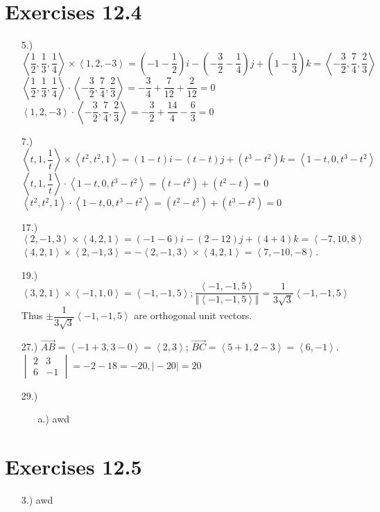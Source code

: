 \documentclass[12pt]{article}
\newcommand{\angleb}[1]{\left\langle#1\right\rangle}
\begin{document}
\pagestyle{fancy}
\fancyhead{}

\normalsize
\section*{Exercises 12.4}
\begin{itemize}
    \item [5.)] $\angleb{\dfrac{1}{2},\dfrac{1}{3},\dfrac{1}{4}}\times\angleb{1,2,-3}=\left(-1-\dfrac{1}{2}\right)i-\left(-\dfrac{3}{2}-\dfrac{1}{4}\right)j+\left(1-\dfrac{1}{3}\right)k=\angleb{-\dfrac{3}{2},\dfrac{7}{4},\dfrac{2}{3}}$\newline
    $\angleb{\dfrac{1}{2},\dfrac{1}{3},\dfrac{1}{4}}\cdot\angleb{-\dfrac{3}{2},\dfrac{7}{4},\dfrac{2}{3}}=-\dfrac{3}{4}+\dfrac{7}{12}+\dfrac{2}{12}=0$\newline
    $\angleb{1,2,-3}\cdot\angleb{-\dfrac{3}{2},\dfrac{7}{4},\dfrac{2}{3}}=-\dfrac{3}{2}+\dfrac{14}{4}-\dfrac{6}{3}=0$

    \item [7.)] $\angleb{t,1,\dfrac{1}{t}}\times\angleb{t^2,t^2,1}=\left(1-t\right)i-(t-t)j+(t^3-t^2)k=\angleb{1-t,0,t^3-t^2}$\newline
    $\angleb{t,1,\dfrac{1}{t}}\cdot\angleb{1-t,0,t^3-t^2}=(t-t^2)+(t^2-t)=0$\newline
    $\angleb{t^2,t^2,1}\cdot\angleb{1-t,0,t^3-t^2}=(t^2-t^3)+(t^3-t^2)=0$

    \item [17.)] $\angleb{2,-1,3}\times\angleb{4,2,1}=(-1-6)i-(2-12)j+(4+4)k=\angleb{-7,10,8}$\newline
    $\angleb{4,2,1}\times\angleb{2,-1,3}=-\angleb{2,-1,3}\times\angleb{4,2,1}=\angleb{7,-10,-8}$.

    \item [19.)] $\angleb{3,2,1}\times\angleb{-1,1,0}=\angleb{-1,-1,5};\dfrac{\angleb{-1,-1,5}}{\Vert\angleb{-1,-1,5}\Vert}=\dfrac{1}{3\sqrt{3}}\angleb{-1,-1,5}$\newline
    Thus $\pm\dfrac{1}{3\sqrt{3}}\angleb{-1,-1,5}$ are orthogonal unit vectors.

    \item [27.)] $\Vec{AB}=\angleb{-1+3,3-0}=\angleb{2,3}$; $\vec{BC}=\angleb{5+1,2-3}=\angleb{6,-1}$.\newline
    $\begin{vmatrix}
        2&3\\6&-1
    \end{vmatrix}=-2-18=-20,\vert-20\vert=20$

    \item [29.)] \begin{itemize}
        \item [a.)] awd
    \end{itemize}
\end{itemize}
\section*{Exercises 12.5}
\begin{itemize}
    \item [3.)] awd
\end{itemize}
\end{document}
